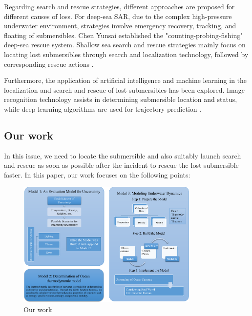 \documentclass[12pt]{article}
\begin{document}
Regarding search and rescue strategies, different approaches are proposed for different causes of loss. For deep-sea SAR, due to the complex high-pressure underwater environment, strategies involve emergency recovery, tracking, and floating of submersibles. Chen Yunsai established the "counting-probing-fishing" deep-sea rescue system. Shallow sea search and rescue strategies mainly focus on locating lost submersibles through search and localization technology, followed by corresponding rescue actions \cite{1019146844.nh}.

Furthermore, the application of artificial intelligence and machine learning in the localization and search and rescue of lost submersibles has been explored. Image recognition technology assists in determining submersible location and status, while deep learning algorithms are used for trajectory prediction \cite{10.1016/j.cola.2023.101199}.

\subsection{Our work}

In this issue, we need to locate the submersible and also suitably launch search and rescue as soon as possible after the incident to rescue the lost submersible faster. In this paper, our work focuses on the following points:

\begin{figure}
    \centering
    \includegraphics[width=0.8\textwidth]{fig/our_work.png}
    \caption{Our work}

\end{figure}
\end{document}
